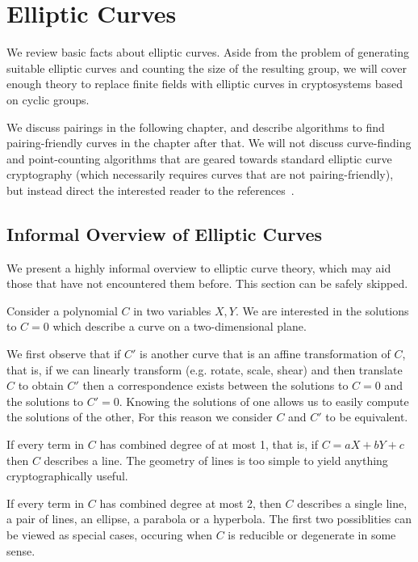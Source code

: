 \chapter {Elliptic Curves}

We review basic facts about elliptic curves.
Aside from the problem of generating suitable elliptic curves
and counting the size of the resulting group,
we will cover enough theory to replace finite fields with
elliptic curves in cryptosystems based on cyclic groups.

We discuss pairings in the following chapter, and describe algorithms
to find pairing-friendly curves in the chapter after that. We will not
discuss curve-finding and point-counting algorithms that are geared
towards standard elliptic curve cryptography (which necessarily requires
curves that are not pairing-friendly), but instead direct
the interested reader to the references~\cite{bss}.

\section {Informal Overview of Elliptic Curves}

We present a highly informal overview to elliptic curve theory,
which may aid those that have not encountered them before.
This section can be safely skipped.

Consider a polynomial $C$ in two variables $X, Y$.
We are interested in the solutions to $C = 0$
which describe a curve on a two-dimensional plane.

We first observe that if $C'$ is another curve that is an affine transformation
of $C$, that is, if we can linearly transform (e.g. rotate, scale, shear)
and then translate $C$ to
obtain $C'$ then a correspondence exists between
the solutions to $C = 0$ and the solutions to $C' = 0$. Knowing
the solutions of one allows us to easily compute the solutions of the other,
For this reason we consider $C$ and $C'$ to be equivalent.

If every term in $C$ has combined degree of at most 1, that is,
if $C = a X + b Y + c$ then $C$ describes a line. The geometry of lines
is too simple to yield anything cryptographically useful.

If every term in $C$ has combined degree at most 2, then $C$ describes
a single line, a pair of lines, an ellipse, a parabola or a hyperbola.
The first two possiblities can be viewed as special cases, occuring
when $C$ is reducible or degenerate in some sense.

